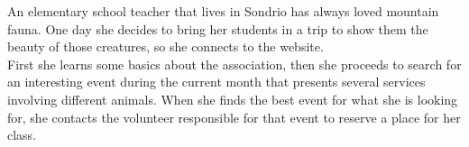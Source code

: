An elementary school teacher that lives in Sondrio has always loved mountain fauna. One day she decides to bring her students in a trip to show them the beauty of those creatures, so she connects to the website.\\
First she learns some basics about the association, then she proceeds to search for an interesting event during the current month that presents several services involving different animals. When she finds the best event for what she is looking for, she contacts the volunteer responsible for that event to reserve a place for her class.